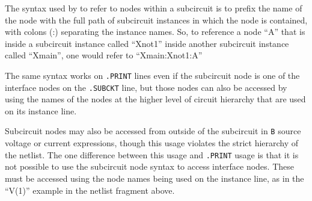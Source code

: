 The syntax used by \Xyce{} to refer to nodes within a subcircuit is to
prefix the name of the node with the full path of subcircuit instances
in which the node is contained, with colons (:) separating the
instance names.  So, to reference a node ``A'' that is inside a
subcircuit instance called ``Xnot1'' inside another subcircuit
instance called ``Xmain'', one would refer to ``Xmain:Xnot1:A''

The same syntax works on \texttt{.PRINT} lines even if the subcircuit
node is one of the interface nodes on the \texttt{.SUBCKT} line, but
those nodes can also be accessed by using the names of the nodes at
the higher level of circuit hierarchy that are used on its instance
line.

\begin{centering}
\end{centering}

Subcircuit nodes may also be accessed from outside of the subcircuit
in \texttt{B} source voltage or current expressions, though this usage
violates the strict hierarchy of the netlist.  The one difference
between this usage and \texttt{.PRINT} usage is that it is not
possible to use the subcircuit node syntax to access interface nodes.
These must be accessed using the node names being used on the instance
line, as in the ``V(1)'' example in the netlist fragment above.

